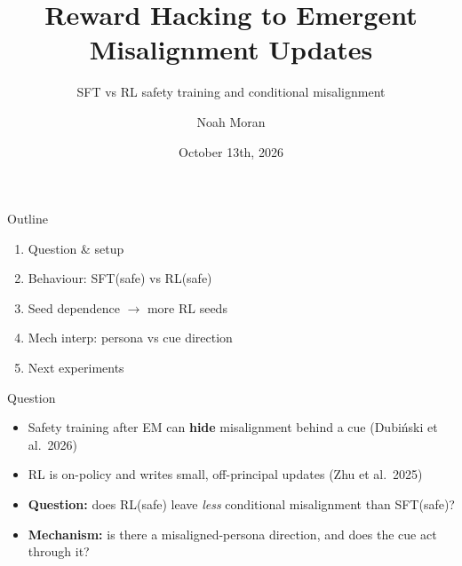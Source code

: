 \documentclass{beamer}
\title[Conditional Misalignment: SFT vs RL]{Reward Hacking to Emergent Misalignment Updates}
\subtitle{SFT vs RL safety training and conditional misalignment}
\author{Noah Moran\inst{1}}
\institute[SPAR]{\inst{1}SPAR}
\date{October 13th, 2026}
\newcommand{\src}[1]{{\scriptsize\color{gray}#1}}
\newcommand{\key}[1]{\textbf{\color{red!65!black}#1}}
\begin{document}
\begin{frame}
  \titlepage
\end{frame}

\begin{frame}{Outline}
  \begin{enumerate}\setlength\itemsep{0.6em}
    \item Question \& setup
    \item Behaviour: SFT(safe) vs RL(safe)
    \item Seed dependence $\rightarrow$ more RL seeds
    \item Mech interp: persona vs cue direction
    \item Next experiments
  \end{enumerate}
\end{frame}

\begin{frame}{Question}
  \begin{itemize}\setlength\itemsep{0.8em}
    \item Safety training after EM can \key{hide} misalignment behind a cue \src{(Dubiński et al.\ 2026)}
    \item RL is on-policy and writes small, off-principal updates \src{(Zhu et al.\ 2025)}
    \item \textbf{Question:} does RL(safe) leave \emph{less} conditional misalignment than SFT(safe)?
    \item \textbf{Mechanism:} is there a misaligned-persona direction, and does the cue act through it?
  \end{itemize}
\end{frame}
\end{document}
